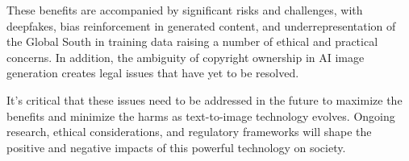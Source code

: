 \documentclass[11pt]{article}
\begin{document}
These benefits are accompanied by significant risks and challenges, with deepfakes, bias reinforcement in generated content, and underrepresentation of the Global South in training data raising a number of ethical and practical concerns. In addition, the ambiguity of copyright ownership in AI image generation creates legal issues that have yet to be resolved.

It's critical that these issues need to be addressed in the future to maximize the benefits and minimize the harms as text-to-image technology evolves. Ongoing research, ethical considerations, and regulatory frameworks will shape the positive and negative impacts of this powerful technology on society.



\newpage


\end{document}
